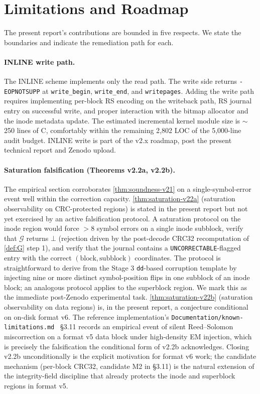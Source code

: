 \section{Limitations and Roadmap}\label{sec:limitations}

The present report's contributions are bounded in five respects.
We state the boundaries and indicate the remediation path for
each.

\paragraph{INLINE write path.}
The INLINE scheme implements only the read path. The write side
returns \texttt{-EOPNOTSUPP} at \texttt{write\_begin},
\texttt{write\_end}, and \texttt{writepages}. Adding the write
path requires implementing per-block RS encoding on the writeback
path, RS journal entry on successful write, and proper
interaction with the bitmap allocator and the inode metadata
update. The estimated incremental kernel module size is
\(\sim\)250 lines of C, comfortably within the remaining 2{,}802
LOC of the 5{,}000-line audit budget. INLINE write is part of the
v2.x roadmap, post the present technical report and Zenodo
upload.

\paragraph{Saturation falsification (Theorems v2.2a, v2.2b).}
The empirical section corroborates \cref{thm:soundness-v21} on a
single-symbol-error event well within the correction capacity.
\cref{thm:saturation-v22a} (saturation observability on
CRC-protected regions) is stated in the present report but not
yet exercised by an active falsification protocol. A saturation
protocol on the inode region would force \(>8\) symbol errors on
a single inode subblock, verify that \(\mathcal{G}\) returns
\(\bot\) (rejection driven by the post-decode CRC32 recomputation
of \cref{def:G} step 1), and verify that the journal contains a
\texttt{UNCORRECTABLE}-flagged entry with the correct
\((\text{block}, \text{subblock})\) coordinates. The protocol is
straightforward to derive from the Stage 3 \texttt{dd}-based
corruption template by injecting nine or more distinct
symbol-position flips in one subblock of an inode block; an
analogous protocol applies to the superblock region. We mark
this as the immediate post-Zenodo experimental task.
\cref{thm:saturation-v22b} (saturation observability on data
regions) is, in the present report, a conjecture conditional on
on-disk format v6. The reference implementation's
\texttt{Documentation/known-limitations.md}~\cite{beamfs-impl}
\S3.11 records an empirical event of silent Reed--Solomon
miscorrection on a format v5 data block under high-density EM
injection, which is precisely the falsification the conditional
form of v2.2b acknowledges. Closing v2.2b unconditionally is the
explicit motivation for format v6 work; the candidate mechanism
(per-block CRC32, candidate M2 in \S3.11) is the natural
extension of the integrity-field discipline that already protects
the inode and superblock regions in format v5.

